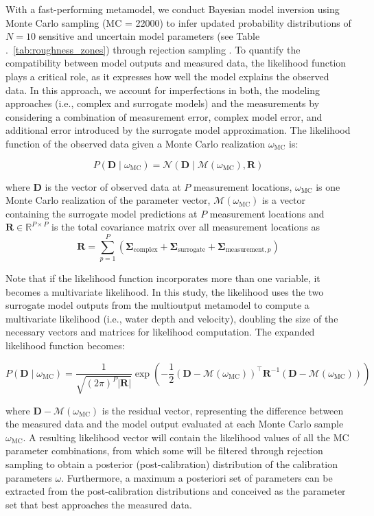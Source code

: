 \documentclass[draft,linenumbers,onecolumn]{agujournal2019} %
\begin{document}
With a fast-performing metamodel, we conduct Bayesian model inversion using Monte Carlo sampling (MC = 22000) to infer updated probability distributions of \(N = 10\) sensitive and uncertain model parameters (see Table .~\ref{tab:roughness_zones}) through rejection sampling \cite{beckers2020bayesian}. To quantify the compatibility between model outputs and measured data, the likelihood function plays a critical role, as it expresses how well the model explains the observed data. In this approach, we account for imperfections in both, the modeling approaches (i.e., complex and surrogate models) and the measurements by considering a combination of measurement error, complex model error, and additional error introduced by the surrogate model approximation. The likelihood function of the observed data given a Monte Carlo realization \( \omega_{\text{MC}} \) is:

\[
P(\bm{D} \mid \omega_{\text{MC}}) = \mathcal{N}(\bm{D} \mid \mathcal{M}(\omega_{\text{MC}}), \bm{R})
\]

where \( \bm{D} \) is the vector of observed data at \(P\) measurement locations, \( \omega_{\text{MC}} \) is one Monte Carlo realization of the parameter vector, \( \mathcal{M}(\omega_{\text{MC}}) \) is a vector containing the surrogate model predictions at \(P\) measurement locations and \( \bm{R} \in \mathbb{R}^{P \times P} \) is the total covariance matrix over all measurement locations as 
\[
\mathbf{R} = \sum_{p=1}^{P} \left( \mathbf{\Sigma}_{\text{complex}} + \mathbf{\Sigma}_{\text{surrogate}} + \mathbf{\Sigma}_{\text{measurement},p} \right)
\]

Note that if the likelihood function incorporates more than one variable, it becomes a multivariate likelihood. In this study, the likelihood uses the two surrogate model outputs from the multioutput metamodel to compute a multivariate likelihood (i.e., water depth and velocity), doubling the size of the necessary vectors and matrices for likelihood computation. The expanded likelihood function becomes: 

\[
P(\bm{D} \mid \omega_{\text{MC}}) = \frac{1}{\sqrt{(2\pi)^P |\bm{R}|}} \exp\left( -\frac{1}{2} \left( \bm{D} - \mathcal{M}(\omega_{\text{MC}}) \right)^\top \bm{R}^{-1} \left( \bm{D} - \mathcal{M}(\omega_{\text{MC}}) \right) \right)
\]


where \( \bm{D} - \mathcal{M}(\omega_{\text{MC}}) \) is the residual vector, representing the difference between the measured data and the model output evaluated at each Monte Carlo sample \( \omega_{\text{MC}} \). A resulting likelihood vector will contain the likelihood values of all the MC parameter combinations, from which some will be filtered through rejection sampling \cite{smith1992bayesian} to obtain a posterior (post-calibration) distribution of the calibration parameters \(\omega\). Furthermore, a maximum a posteriori set of parameters can be extracted from the post-calibration distributions and conceived as the parameter set that best approaches the measured data.
\end{document}
